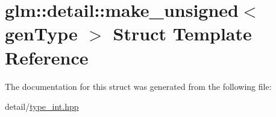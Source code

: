 \hypertarget{structglm_1_1detail_1_1make__unsigned}{\section{glm\-:\-:detail\-:\-:make\-\_\-unsigned$<$ gen\-Type $>$ Struct Template Reference}
\label{structglm_1_1detail_1_1make__unsigned}
}


The documentation for this struct was generated from the following file\-:\begin{DoxyCompactItemize}
\item 
detail/\hyperlink{type__int_8hpp}{type\-\_\-int.\-hpp}\end{DoxyCompactItemize}
